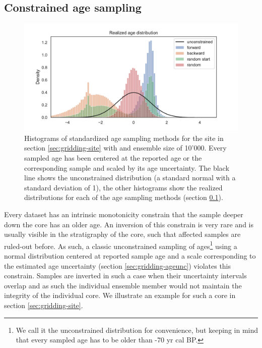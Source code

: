 \begin{refsection}
\subsection{Constrained age sampling}  \label{sec:gridding-age-sampling}

\begin{figure}
	\includegraphics[width=\linewidth]{gridding-figures/age-sampling-methods-realized.pdf}
	\caption[Scaled histograms of age sampling methods]{Histograms of standardized age sampling methods for the site in section \ref{sec:gridding-site} with and ensemble size of 10'000. Every sampled age has been centered at the reported age or the corresponding sample and scaled by its age uncertainty. The black line shows the unconstrained distribution (a standard normal with a standard deviation of 1), the other histograms show the realized distributions for each of the age sampling methods (section \ref{sec:gridding-age-sampling}).}
	\label{fig:gridding-age-sampling-methods}
\end{figure}

Every dataset has an intrinsic monotonicity constrain that the sample deeper down the core has an older age. An inversion of this constrain is very rare and is usually visible in the stratigraphy of the core, such that affected samples are ruled-out before. As such, a classic unconstrained sampling of ages\footnote{\label{foot:unconstrained-note}We call it the unconstrained distribution for convenience, but keeping in mind that every sampled age has to be older than -70 yr cal BP.} using a normal distribution centered at reported sample age and a scale corresponding to the estimated age uncertainty (section \ref{sec:gridding-ageunc}) violates this constrain. Samples are inverted in such a case when their uncertainty intervals overlap and as such the individual ensemble member would not maintain the integrity of the individual core. We illustrate an example for such a core in section \ref{sec:gridding-site}.


\end{refsection}
